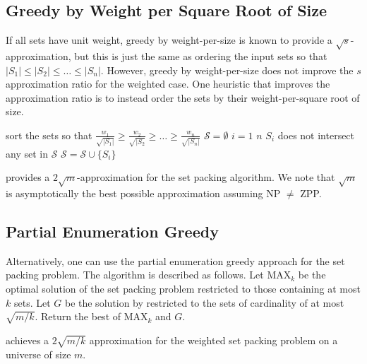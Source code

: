 \subsection{Greedy by Weight per Square Root of Size}

If all sets have unit weight, greedy by weight-per-size is known to provide a $\sqrt{s}$-approximation, but this is just the same as ordering the input sets so that $|S_1| \leq |S_2| \leq \ldots \leq |S_n|$. However, greedy by weight-per-size does not improve the $s$ approximation ratio for the weighted case. One heuristic that improves the approximation ratio is to instead order the sets by their weight-per-square root of size.

\begin{codebox}
    \li sort the sets so that $\frac{w_1}{\sqrt{|S_1|}} \geq \frac{w_2}{\sqrt{|S_2}} \geq \ldots \geq \frac{w_n}{\sqrt{|S_n|}}$
    \li $\mathcal{S} = \emptyset$
    \li \For $i = 1$ \To $n$ \Do
        \li \If $S_i$ does not intersect any set in $\mathcal{S}$ \Then
            \li $\mathcal{S} = \mathcal{S} \cup \{S_i\}$  
\end{codebox}

\begin{theorem}
     provides a $2 \sqrt{m}$-approximation for the set packing algorithm. We note that $\sqrt{m}$ is asymptotically the best possible approximation assuming NP $\neq$ ZPP.
\end{theorem}

\subsection{Partial Enumeration Greedy}

Alternatively, one can use the partial enumeration greedy approach for the set packing problem. The algorithm  is described as follows. Let $\mathrm{MAX}_k$ be the optimal solution of the set packing problem restricted to those containing at most $k$ sets. Let $G$ be the solution by  restricted to the sets of cardinality of at most $\sqrt{m/k}$. Return the best of $\mathrm{MAX}_k$ and $G$.

\begin{theorem}
     achieves a $2\sqrt{m/k}$ approximation for the weighted set packing problem on a universe of size $m$.
\end{theorem}


